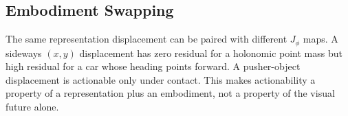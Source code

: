\subsection{Embodiment Swapping}
The same representation displacement can be paired with different $J_\phi$ maps. A sideways $(x,y)$ displacement has zero residual for a holonomic point mass but high residual for a car whose heading points forward. A pusher-object displacement is actionable only under contact. This makes actionability a property of a representation plus an embodiment, not a property of the visual future alone.
